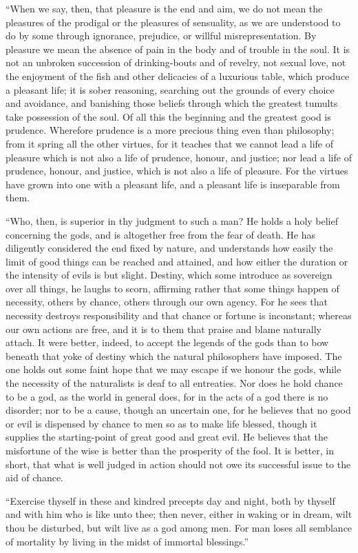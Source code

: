 ``When we say, then, that pleasure is the end and aim, we do not mean
the pleasures of the prodigal or the pleasures of sensuality, as we
are understood to do by some through ignorance, prejudice, or willful
misrepresentation. By pleasure we mean the absence of pain in the body
and of trouble in the soul. It is not an unbroken succession of
drinking-bouts and of revelry, not sexual love, not the enjoyment of
the fish and other delicacies of a luxurious table, which produce a
pleasant life; it is sober reasoning, searching out the grounds of
every choice and avoidance, and banishing those beliefs through which
the greatest tumults take possession of the soul. Of all this the
beginning and the greatest good is prudence. Wherefore prudence is a
more precious thing even than philosophy; from it spring all the other
virtues, for it teaches that we cannot lead a life of pleasure which
is not also a life of prudence, honour, and justice; nor lead a life
of prudence, honour, and justice, which is not also a life of
pleasure. For the virtues have grown into one with a pleasant life,
and a pleasant life is inseparable from them.

``Who, then, is superior in thy judgment to such a man? He holds a
holy belief concerning the gods,  and is altogether free
from the fear of death. He has diligently considered the end fixed by
nature, and understands how easily the limit of good things can be
reached and attained, and how either the duration or the intensity of
evils is but slight. Destiny, which some introduce as sovereign over
all things, he laughs to scorn, affirming rather that some things
happen of necessity, others by chance, others through our own agency.
For he sees that necessity destroys responsibility and that chance or
fortune is inconstant; whereas our own actions are free, and it is to
them that praise and blame naturally attach. It were better, indeed,
to accept the legends of the gods than to bow beneath that yoke of
destiny which the natural philosophers have imposed. The one holds out
some faint hope that we may escape if we honour the gods, while the
necessity of the naturalists is deaf to all entreaties. Nor does he
hold chance to be a god, as the world in general does, for in the acts
of a god there is no disorder; nor to be a cause, though an uncertain
one, for he believes that no good or evil is dispensed by chance to
men so as to make life blessed, though it supplies the starting-point
of great good and great evil. He believes that the misfortune of the
wise is better than the prosperity of the fool. It is better, in
short, that what is well judged in action should not owe its
successful issue to the aid of chance.

``Exercise thyself in these and kindred precepts day and night, both
by thyself and with him who is like unto thee; then never, either in
waking or in dream, wilt thou be disturbed, but wilt live as a god
among men. For man loses all semblance of mortality by living in the
midst of immortal blessings.''

